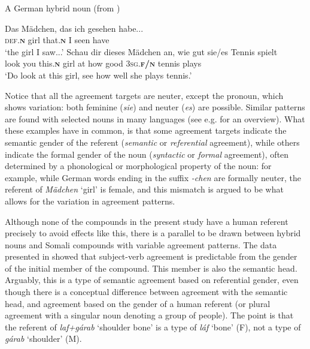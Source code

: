 \documentclass[output=paper]{langscibook}
\begin{document}
\ea\label{ex:kaldhol:german}
	A German hybrid noun (from \citealt[228]{Corbett1991})
	\begin{xlist}
		\ex
		\gll Das Mädchen, das ich gesehen habe...\\
		\textsc{def}.\textbf{\textsc{n}} girl that.\textbf{\textsc{n}} I seen have\\
		\glt `the girl I saw...'
		\ex
		\gll Schau dir dieses Mädchen an, wie gut sie/es Tennis spielt\\
		look you this.\textbf{\textsc{n}} girl at how good \textsc{3sg}.\textbf{\textsc{f/n}} tennis plays\\
		\glt `Do look at this girl, see how well she plays tennis.'
	\end{xlist}
\z
Notice that all the agreement targets are neuter, except the pronoun, which shows variation: both feminine (\textit{sie}) and neuter (\textit{es}) are possible. Similar patterns are found with selected nouns in many languages (see e.g.\@ \citealt[228--232]{Corbett1991} for an overview). What these examples have in common, is that some agreement targets indicate the semantic gender of the referent (\textit{semantic} or \textit{referential} agreement), while others indicate the formal gender of the noun (\textit{syntactic} or \textit{formal} agreement), often determined by a phonological or morphological property of the noun: for example, while German words ending in the suffix {\textit{-chen}} are formally neuter, the referent of \textit{Mädchen} `girl' is female, and this mismatch is argued to be what allows for the variation in agreement patterns. 

Although none of the compounds in the present study have a human referent precisely to avoid effects like this, there is a parallel to be drawn between hybrid nouns and Somali compounds with variable agreement patterns. The data presented in  showed that subject-verb agreement is predictable from the gender of the initial member of the compound. This member is also the semantic head. Arguably, this is a type of semantic agreement based on referential gender, even though there is a conceptual difference between agreement with the semantic head, and agreement based on the gender of a human referent (or plural agreement with a singular noun denoting a group of people). The point is that the referent of \textit{laf+gárab} `shoulder bone' is a type of \textit{láf} `bone' (F), not a type of \textit{gárab} `shoulder' (M).
\end{document}
